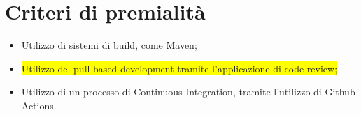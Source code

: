 \documentclass[12pt]{article}
\begin{document}
  \section{Criteri di premialità}
  
  \begin{itemize}
      \item Utilizzo di sistemi di build, come Maven;
      \item \colorbox{yellow}{Utilizzo del pull-based development tramite l’applicazione di code review;}
      \item Utilizzo di un processo di Continuous Integration, tramite l’utilizzo di Github Actions.
  \end{itemize}
\end{document}
